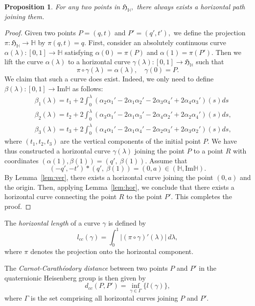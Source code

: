 \documentclass [12pt,a4paper]{amsart}
\renewcommand{\Im}{\textrm{Im}}
\newcommand{\mH}{\mathbb{H}}
\newcommand{\frakH}{\mathfrak{H}}
\theoremstyle{plain}
\newtheorem{prop}[thm]{Proposition}
\theoremstyle{definition}
\numberwithin{equation}{section}
\begin{document}
\begin{prop}\label{thm:hor}
For any two points in $\frakH_{\mathbb{H}},$ there always exists a horizontal path joining them.
\end{prop}
\begin{proof} Given two points $P=(q, t)$ and  $P'=(q', t'),$
we define the projection $\pi: \frakH_{\mathbb{H}}\to \mathbb{H}$ by $\pi(q, t)=q.$
First, consider an absolutely continuous curve $\alpha(\lambda):[0, 1]\rightarrow\mathbb{H}$ satisfying $\alpha(0)=\pi(P)$ and $\alpha(1)=\pi(P').$ Then we lift the curve $\alpha(\lambda)$ to 
a horizontal curve $\gamma(\lambda):[0, 1]\rightarrow\frakH_\mathbb{H}$ such that 
$$\pi\circ\gamma(\lambda)=\alpha(\lambda ), \quad\gamma(0)=P.$$
We claim that such a curve does exist. Indeed, we only need to define $\beta(\lambda):[0, 1]\to\Im\mH$ as follows:
\begin{eqnarray*}
&&\beta_1(\lambda)=t_1+2\int_0^{\lambda }(\alpha_2\alpha_1'-2\alpha_1\alpha_2'-2\alpha_3\alpha_4'+2\alpha_4\alpha_3')(s)ds\\
&&\beta_2(\lambda )=t_2+2\int_0^{\lambda }(\alpha_3\alpha_1'-2\alpha_1\alpha_3'-2\alpha_4\alpha_2'+2\alpha_2\alpha_4')(s)ds,\\
&&\beta_3(\lambda )=t_3+2\int_0^{\lambda }(\alpha_4\alpha_1'-2\alpha_1\alpha_4'-2\alpha_2\alpha_3'+2\alpha_3\alpha_2')(s)ds,
\end{eqnarray*}
where $(t_1, t_2, t_3)$ are the vertical components of the initial point $P.$
We have thus constructed a horizontal curve \(\gamma(\lambda) \) joining the point \( P \) to a point \( R \) with coordinates  
$
(\alpha(1), \beta(1)) = (q',\ \beta(1)).
$
Assume that  
\[
(-q', -t') \ast (q',\ \beta(1)) = (0, a) \in (\mH, \Im \mH).
\]  
By Lemma~\ref{lem:ver}, there exists a horizontal curve joining the point \( (0, a) \) and the origin.  
Then, applying Lemma~\ref{lem:hor}, we conclude that there exists a  horizontal curve connecting the point \( R \) to the point \( P' \).  
This completes the proof.
\end{proof}
The {\it horizontal length} of a curve  $ \gamma$ is defined by  
$$
l_{cc}(\gamma) = \int_0^1 \left| (\pi \circ \gamma)'(\lambda) \right| \, d\lambda,
$$ 
where $\pi$ denotes the projection onto the horizontal component.

The {\it Carnot-Carathéodory distance} between two points $P$ and $P'$ in the quaternionic Heisenberg group is then given by  
$$
d_{cc}(P, P') = \inf_{\gamma\in \Gamma}\{l(\gamma)\},
$$
where $\Gamma$ is the set comprising all horizontal curves joining $P$ and $P'.$
\end{document}
